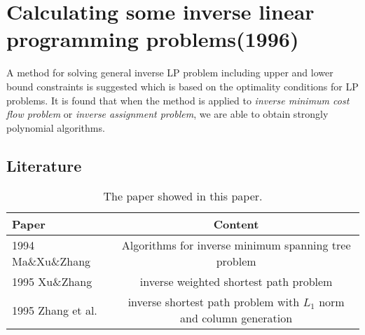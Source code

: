 \documentclass[UTF8]{article}
\begin{document}
\section{Calculating some inverse linear programming problems(1996)}

A method for solving general inverse LP problem including upper and lower bound constraints is suggested which is based on the optimality conditions for LP problems. It is found that when the method is applied to \emph{inverse minimum cost flow problem} or \emph{inverse assignment problem}, we are able to obtain strongly polynomial algorithms.


\subsection{Literature}

\begin{table}[ht]

\tabcolsep=40pt

\small\renewcommand{}

\caption{The paper showed in this paper.\label{tab:9}}

{\begin{tabular}{lc}
\hline
Paper & Content \\
\hline
1994  Ma\&Xu\&Zhang & Algorithms for inverse minimum spanning tree problem \\
\hline
1995 Xu\&Zhang & inverse weighted shortest path problem \\
\hline
1995 Zhang et al. & inverse shortest path problem with $L_1$ norm and column generation \\
\hline
\end{tabular}}
{}
\end{table}
\end{document}
